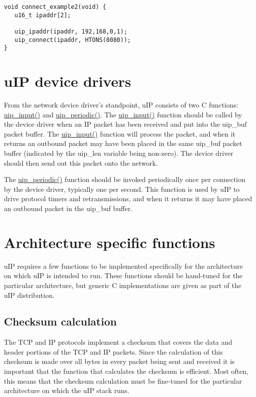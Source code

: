 \footnotesize\begin{verbatim}void connect_example2(void) {
   u16_t ipaddr[2];

   uip_ipaddr(ipaddr, 192,168,0,1);
   uip_connect(ipaddr, HTONS(8080));
}
\end{verbatim}
\normalsize
\hypertarget{main_drivers}{}\section{u\-IP device drivers}\label{main_drivers}
From the network device driver's standpoint, u\-IP consists of two C functions: \hyperlink{a00063_ga4360412ee9350fba725f98a137169fe}{uip\_\-input()} and \hyperlink{a00063_g1024f8a5fa65e82bf848b2e6590d9628}{uip\_\-periodic()}. The \hyperlink{a00063_ga4360412ee9350fba725f98a137169fe}{uip\_\-input()} function should be called by the device driver when an IP packet has been received and put into the uip\_\-buf packet buffer. The \hyperlink{a00063_ga4360412ee9350fba725f98a137169fe}{uip\_\-input()} function will process the packet, and when it returns an outbound packet may have been placed in the same uip\_\-buf packet buffer (indicated by the uip\_\-len variable being non-zero). The device driver should then send out this packet onto the network.

The \hyperlink{a00063_g1024f8a5fa65e82bf848b2e6590d9628}{uip\_\-periodic()} function should be invoked periodically once per connection by the device driver, typically one per second. This function is used by u\-IP to drive protocol timers and retransmissions, and when it returns it may have placed an outbound packet in the uip\_\-buf buffer.\hypertarget{main_arch}{}\section{Architecture specific functions}\label{main_arch}
u\-IP requires a few functions to be implemented specifically for the architecture on which u\-IP is intended to run. These functions should be hand-tuned for the particular architecture, but generic C implementations are given as part of the u\-IP distribution.\hypertarget{main_checksums}{}\subsection{Checksum calculation}\label{main_checksums}
The TCP and IP protocols implement a checksum that covers the data and header portions of the TCP and IP packets. Since the calculation of this checksum is made over all bytes in every packet being sent and received it is important that the function that calculates the checksum is efficient. Most often, this means that the checksum calculation must be fine-tuned for the particular architecture on which the u\-IP stack runs.

